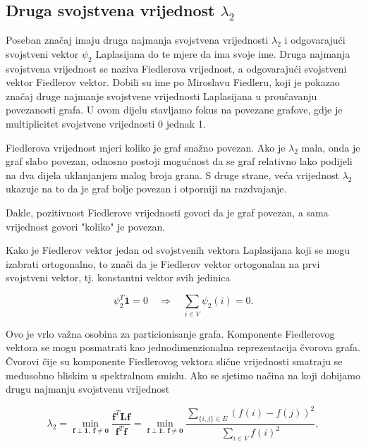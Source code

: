 \subsection{Druga svojstvena vrijednost \(\lambda_2\)}

Poseban značaj imaju druga najmanja svojstvena vrijednosti \(\lambda_2\) i odgovarajući svojstveni vektor \(\psi_2\) Laplasijana do te mjere da ima svoje ime. Druga najmanja svojstvena vrijednost se naziva Fiedlerova vrijednost, a odgovarajući svojstveni vektor Fiedlerov vektor. Dobili su ime po Miroslavu Fiedleru, koji je pokazao značaj druge najmanje svojstvene vrijednosti Laplasijana u proučavanju povezanosti grafa. U ovom dijelu stavljamo fokus na povezane grafove, gdje je multiplicitet svojstvene vrijednosti 0 jednak 1.

Fiedlerova vrijednost mjeri koliko je graf snažno povezan. Ako je \(\lambda_2\) mala, onda je graf slabo povezan, odnosno postoji mogućnost da se graf relativno lako podijeli na dva dijela uklanjanjem malog broja grana. S druge strane, veća vrijednost \(\lambda_2\) ukazuje na to da je graf bolje povezan i otporniji na razdvajanje.

Dakle, pozitivnost Fiedlerove vrijednosti govori da je graf povezan, a sama vrijednost govori "koliko" je povezan.

Kako je Fiedlerov vektor jedan od svojstvenih vektora Laplasijana koji se mogu izabrati ortogonalno, to znači da je Fiedlerov vektor ortogonalan na prvi svojstveni vektor, tj. konstantni vektor svih jedinica

\begin{equation}
    \psi_2^T\mathbf{1}=0 \quad\Rightarrow\quad \sum_{i\in V}\psi_2(i)=0.
\end{equation}

Ovo je vrlo važna osobina za particionisanje grafa. Komponente Fiedlerovog vektora se mogu posmatrati kao jednodimenzionalna reprezentacija čvorova grafa. Čvorovi čije su komponente Fiedlerovog vektora slične vrijednosti smatraju se međusobno bliskim u spektralnom smislu. Ako se sjetimo načina na koji dobijamo drugu najmanju svojstvenu vrijednost

\begin{equation}
    \lambda_2
    =
    \min_{\mathbf{f}\perp \mathbf{1},\ \mathbf{f}\neq \mathbf{0}}
    \frac{\mathbf{f}^T\mathbf{L}\mathbf{f}}{\mathbf{f}^T\mathbf{f}}
    =
    \min_{\mathbf{f}\perp \mathbf{1},\ \mathbf{f}\neq \mathbf{0}}
    \frac{\sum_{\{i,j\}\in E}(f(i)-f(j))^2}{\sum_{i\in V} f(i)^2},
\end{equation}

